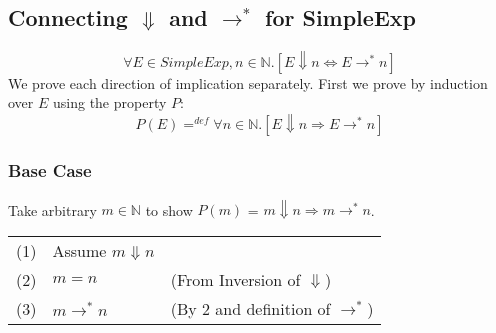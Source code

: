 \documentclass{report}
\begin{document}
\subsection*{Connecting $\Downarrow$ and $\to^*$ for SimpleExp}
\[\forall E \in SimpleExp, n \in \mathbb{N}.[E \Downarrow n \Leftrightarrow E \to^* n]\]
We prove each direction of implication separately. First we prove by induction over $E$ using the property $P$:
\[P(E) =^{def} \forall n \in \mathbb{N}.[E \Downarrow n \Rightarrow E \to^* n]\]
\subsubsection*{Base Case}
Take arbitrary $m \in \mathbb{N}$ to show $P(m)$ = $m \Downarrow n \Rightarrow m \to^* n$.
\begin{center}
	\begin{tabular}{l l l}
		(1) & Assume $m \Downarrow n$ &                                  \\
		(2) & $m = n$                 & (From Inversion of $\Downarrow$) \\
		(3) & $m \to^* n$             & (By 2 and definition of $\to^*$) \\
	\end{tabular}
\end{center}
\end{document}

